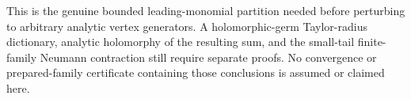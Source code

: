\begin{remark}
This is the genuine bounded leading-monomial partition needed before perturbing to arbitrary analytic vertex generators. A holomorphic-germ Taylor-radius dictionary, analytic holomorphy of the resulting sum, and the small-tail finite-family Neumann contraction still require separate proofs. No convergence or prepared-family certificate containing those conclusions is assumed or claimed here.
\end{remark}
